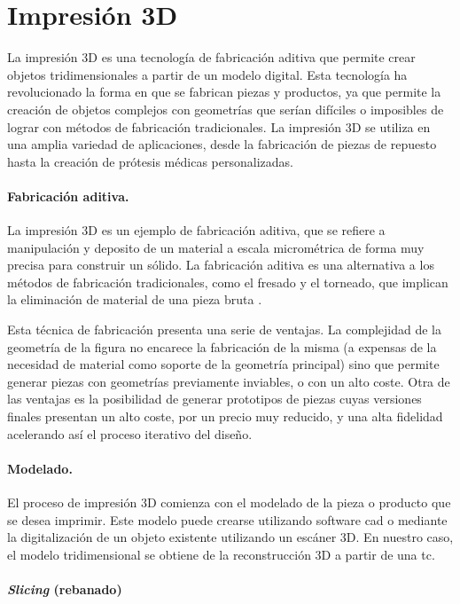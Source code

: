 \section{Impresión 3D}

La impresión 3D es una tecnología de fabricación aditiva que permite crear objetos tridimensionales a partir de un modelo digital. Esta tecnología ha revolucionado la forma en que se fabrican piezas y productos, ya que permite la creación de objetos complejos con geometrías que serían difíciles o imposibles de lograr con métodos de fabricación tradicionales. La impresión 3D se utiliza en una amplia variedad de aplicaciones, desde la fabricación de piezas de repuesto hasta la creación de prótesis médicas personalizadas.

\paragraph{Fabricación aditiva.}
La impresión 3D es un ejemplo de fabricación aditiva, que se refiere a manipulación y deposito de un material a escala micrométrica de forma muy precisa para construir un sólido. La fabricación aditiva es una alternativa a los métodos de fabricación tradicionales, como el fresado y el torneado, que implican la eliminación de material de una pieza bruta \cite{zahera2012fabricacion}.

Esta técnica de fabricación presenta una serie de ventajas. La complejidad de la geometría de la figura no encarece la fabricación de la misma (a expensas de la necesidad de material como soporte de la geometría principal) sino que permite generar piezas con geometrías previamente inviables, o con un alto coste.
Otra de las ventajas es la posibilidad de generar prototipos de piezas cuyas versiones finales presentan un alto coste, por un precio muy reducido, y una alta fidelidad acelerando así el proceso iterativo del diseño.

\paragraph{Modelado.}
El proceso de impresión 3D comienza con el modelado de la pieza o producto que se desea imprimir. Este modelo puede crearse utilizando software \acrfull{cad} o mediante la digitalización de un objeto existente utilizando un escáner 3D. En nuestro caso, el modelo tridimensional se obtiene de la reconstrucción 3D a partir de una \acrshort{tc}.

\paragraph{\emph{Slicing} (rebanado)}

